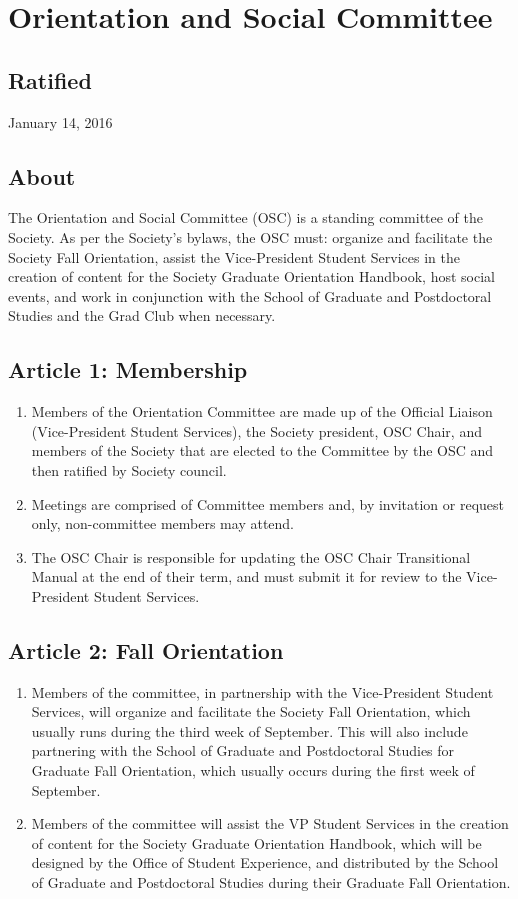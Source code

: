 \section{Orientation and Social Committee}
\subsection{Ratified}
January 14, 2016
\subsection{About}
The Orientation and Social Committee (OSC) is a standing committee of the Society. As per the Society's bylaws, the OSC must: organize and facilitate the Society Fall Orientation, assist the Vice-President Student Services in the creation of content for the Society Graduate Orientation Handbook, host social events, and work in conjunction with the School of Graduate and Postdoctoral Studies and the Grad Club when necessary.
\subsection{Article 1: Membership}
\begin{enumerate}
\item Members of the Orientation Committee are made up of the Official Liaison (Vice-President Student Services), the Society president, OSC Chair, and members of the Society that are elected to the Committee by the OSC and then ratified by Society council.
\item Meetings are comprised of Committee members and, by invitation or request only, non-committee members may attend.
\item The OSC Chair is responsible for updating the OSC Chair Transitional Manual at the end of their term, and must submit it for review to the Vice-President Student Services.
\end{enumerate}
\subsection{Article 2: Fall Orientation}
\begin{enumerate}
\item Members of the committee, in partnership with the Vice-President Student Services, will organize and facilitate the Society Fall Orientation, which usually runs during the third week of September. This will also include partnering with the School of Graduate and Postdoctoral Studies for Graduate Fall Orientation, which usually occurs during the first week of September.
\item Members of the committee will assist the VP Student Services in the creation of content for the Society Graduate Orientation Handbook, which will be designed by the Office of Student Experience, and distributed by the School of Graduate and Postdoctoral Studies during their Graduate Fall Orientation.
\end{enumerate}
